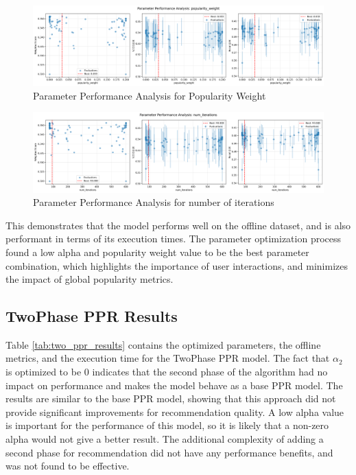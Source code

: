 \documentclass[conference,compsoc]{IEEEtran}
\begin{document}
\begin{figure}[!ht]
    \centering
    \includegraphics[width=\linewidth]{images/parameter_analysis_popularity_weight.png}
    \caption{Parameter Performance Analysis for Popularity Weight}
    \label{fig:ppr_popularity}
\end{figure}
\begin{figure}[!ht]
    \centering
    \includegraphics[width=\linewidth]{images/parameter_analysis_num_iterations.png}
    \caption{Parameter Performance Analysis for number of iterations}
    \label{fig:ppr_iterations}
\end{figure}
This demonstrates that the model performs well on the offline dataset, and is also performant in terms of its execution times. The parameter optimization process found a low alpha and popularity weight value to be the best parameter combination, which highlights the importance of user interactions, and minimizes the impact of global popularity metrics.

\subsection{TwoPhase PPR Results}
Table \ref{tab:two_ppr_results} contains the optimized parameters, the offline metrics, and the execution time for the TwoPhase PPR model.  The fact that \(\alpha_2\) is optimized to be 0 indicates that the second phase of the algorithm had no impact on performance and makes the model behave as a base PPR model. The results are similar to the base PPR model, showing that this approach did not provide significant improvements for recommendation quality. A low alpha value is important for the performance of this model, so it is likely that a non-zero alpha would not give a better result. The additional complexity of adding a second phase for recommendation did not have any performance benefits, and was not found to be effective.
\end{document}
